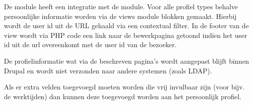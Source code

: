 De  module heeft een integratie met de  module. Voor alle profiel types behalve persoonlijke informatie worden via de views module blokken gemaakt. Hierbij wordt de user id uit de URL gehaald via een contextual filter. In de footer van de view wordt via PHP code een link naar de bewerkpagina getoond indien het user id uit de url overeenkomt met de user id van de bezoeker.

De profielinformatie wat via de beschreven pagina's wordt aangepast blijft binnen Drupal en wordt niet verzonden naar andere systemen (zoals LDAP).

Als er extra velden toegevoegd moeten worden die vrij invulbaar zijn (voor bijv. de werktijden) dan kunnen deze toegevoegd worden aan het persoonlijk profiel.
